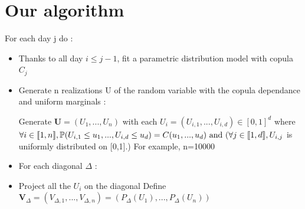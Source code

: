 \documentclass{article}
\begin{document}
	

	  
	  \section{Our algorithm}
	  
	  For each day j do :

\begin{itemize}

\item Thanks to all day \begin{math}i \leq j-1\end{math}, fit a parametric distribution model with copula \begin{math} C_j \end{math}

\item Generate n realizations U of the random variable with the copula dependance and uniform marginals :\newline

	Generate \begin{math} \textbf{U}=(U_1,...,U_n) \end{math} with each \begin{math} U_i = (U_{i,1},...,U_{i,d}) \in [0,1]^d \end{math} \newline
\newline	
	 where \begin{math} \forall i \in \llbracket 1,n \rrbracket , \newline \mathbb{P} (U_{i,1} \leq u_1,..., U_{i,d} \leq u_d )= C(u_1,...,u_d) \text{ and } \newline
	( \forall j \in \llbracket 1,d \rrbracket, U_{i,j} \end{math} is uniformly distributed on [0,1].) \newline
	For example, n=10000  \newline
	
	
	
\item For each diagonal $\Delta$ : 
\item 
Project all the \begin{math} U_i \end{math} on the diagonal
\newline
	Define \begin{math} \textbf{V}_{\Delta} =(V_{\Delta ,1},...,V_{\Delta ,n})=(P_\Delta(U_1),...,P_\Delta(U_n)) \end{math}


\end{itemize}
\end{document}
